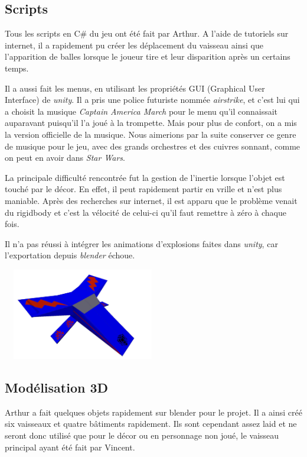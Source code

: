 \documentclass[10pt, titlepage]{report}
\begin{document}
\subsection{Scripts}
Tous les scripts en C\# du jeu ont été fait par Arthur. A l'aide de tutoriels sur internet, il a rapidement pu créer les déplacement du vaisseau ainsi que l'apparition de balles lorsque le joueur tire et leur disparition après un certains temps.

 Il a aussi fait les menus, en utilisant les propriétés GUI (Graphical User Interface) de \textit{unity}. Il a pris une police futuriste nommée \textit{airstrike}, et c'est lui qui a choisit la musique \textit{Captain America March} pour le menu qu'il connaissait auparavant puisqu'il l'a joué à la trompette. Mais pour plus de confort, on a mis la version officielle de la musique. Nous aimerions par la suite conserver ce genre de musique pour le jeu, avec des grands orchestres et des cuivres sonnant, comme on peut en avoir dans \textit{Star Wars}.

La principale difficulté rencontrée fut la gestion de l'inertie lorsque l'objet est touché par le décor. En effet, il peut rapidement partir en vrille et n'est plus maniable. Après des recherches sur internet, il est apparu que le problème venait du rigidbody et c'est la vélocité de celui-ci qu'il faut remettre à zéro à chaque fois.

Il n'a pas réussi à intégrer les animations d'explosions faites dans \textit{unity}, car l'exportation depuis \textit{blender} échoue.

\begin{center}
\includegraphics[height=4cm, width=7cm]{vaisseau arthur.jpg}\\
\end{center}

\subsection{Modélisation 3D}
Arthur a fait quelques objets rapidement sur blender pour le projet. Il a ainsi créé six vaisseaux et quatre bâtiments rapidement. Ils sont cependant assez laid et ne seront donc utilisé que pour le décor ou en personnage non joué, le vaisseau principal ayant été fait par Vincent.
\end{document}
